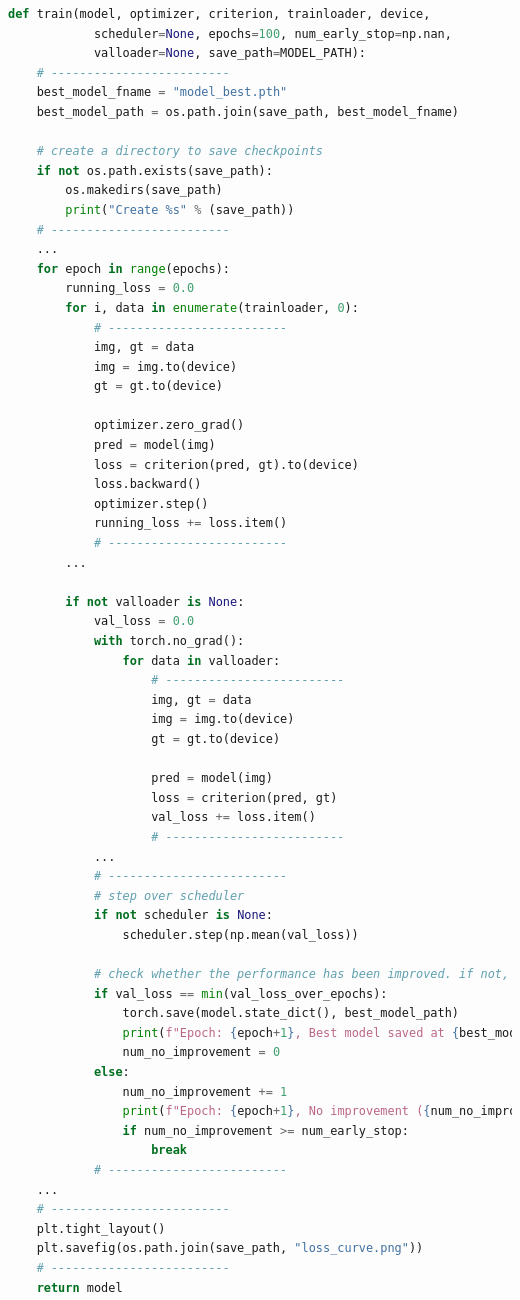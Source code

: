 \documentclass[11pt]{article}
\begin{document}
\begin{lstlisting}[language=Python, basicstyle=\scriptsize]
def train(model, optimizer, criterion, trainloader, device, 
            scheduler=None, epochs=100, num_early_stop=np.nan,
            valloader=None, save_path=MODEL_PATH):
    # -------------------------
    best_model_fname = "model_best.pth"
    best_model_path = os.path.join(save_path, best_model_fname)

    # create a directory to save checkpoints
    if not os.path.exists(save_path):
        os.makedirs(save_path)
        print("Create %s" % (save_path))
    # -------------------------
    ...
    for epoch in range(epochs):
        running_loss = 0.0
        for i, data in enumerate(trainloader, 0):
            # -------------------------
            img, gt = data
            img = img.to(device)
            gt = gt.to(device)
            
            optimizer.zero_grad()
            pred = model(img)
            loss = criterion(pred, gt).to(device)
            loss.backward()
            optimizer.step()
            running_loss += loss.item()
            # -------------------------
        ...

        if not valloader is None:
            val_loss = 0.0
            with torch.no_grad():
                for data in valloader:
                    # -------------------------
                    img, gt = data
                    img = img.to(device)
                    gt = gt.to(device)
                    
                    pred = model(img)
                    loss = criterion(pred, gt)
                    val_loss += loss.item()
                    # -------------------------
            ...
            # -------------------------
            # step over scheduler
            if not scheduler is None:
                scheduler.step(np.mean(val_loss))

            # check whether the performance has been improved. if not, quit training
            if val_loss == min(val_loss_over_epochs):
                torch.save(model.state_dict(), best_model_path)
                print(f"Epoch: {epoch+1}, Best model saved at {best_model_path}")
                num_no_improvement = 0
            else:
                num_no_improvement += 1
                print(f"Epoch: {epoch+1}, No improvement ({num_no_improvement} / {num_early_stop})")
                if num_no_improvement >= num_early_stop:
                    break
            # -------------------------
    ...
    # -------------------------
    plt.tight_layout()
    plt.savefig(os.path.join(save_path, "loss_curve.png"))
    # -------------------------
    return model
\end{lstlisting}
\end{document}
